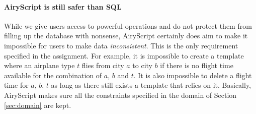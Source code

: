 \paragraph{AiryScript is still safer than SQL}
While we give users access to powerful operations and do not protect them from
filling up the database with nonsense, AiryScript certainly does aim to make it
impossible for users to make data \emph{inconsistent}. This is the only
requirement specified in the assignment. For example, it is impossible to create
a template where an airplane type $t$ flies from city $a$ to city $b$ if there
is no flight time available for the combination of $a$, $b$ and $t$. It is also
impossible to delete a flight time for $a$, $b$, $t$ as long as there still
exists a template that relies on it. Basically, AiryScript makes sure all the
constraints specified in the domain of Section \ref{sec:domain} are kept.



